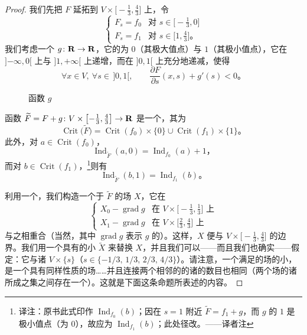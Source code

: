 \begin{proof}
我们先把 $F$ 延拓到 $V\times\bigl[-\tfrac{1}{3},\tfrac{4}{3}\bigr]$ 上，令
\[
\begin{cases}
F_s=f_0 & \text{对 } s\in\bigl[-\tfrac{1}{3},0\bigr]\\
F_s=f_1 & \text{对 } s\in\bigl[1,\tfrac{4}{3}\bigr]\text{。}
\end{cases}
\]
我们考虑一个\trMorseFunction{} $g\colon\mathbf{R}\to\mathbf{R}$，它的\trCriticalPoint{}为 $0$（其极大值点）与 $1$（其极小值点），它在 $]{-\infty},0[$ 上与 $]1,{+\infty}[$ 上递增，而在 $]0,1[$ 上充分地递减，使得
\[
\forall x\in V,\ \forall s\in\,]0,1[,\qquad
\frac{\partial F}{\partial s}(x,s)+g'(s)<0\text{。}
\]

\begin{figure}[htbp]
\centering
{}
\caption{函数 $g$}
\label{fig:function-g}
\end{figure}

函数 $\widetilde{F}=F+g\colon V\times\bigl[-\tfrac{1}{3},\tfrac{4}{3}\bigr]\to\mathbf{R}$ 是一个\trMorseFunction，其\trCriticalPoint{}为
\[
\operatorname{Crit}\bigl(\widetilde{F}\bigr)
  =\operatorname{Crit}(f_0)\times\{0\}\cup\operatorname{Crit}(f_1)\times\{1\}\text{。}
\]
此外，对 $a\in\operatorname{Crit}(f_0)$，
\[
\operatorname{Ind}_{\widetilde{F}}(a,0)=\operatorname{Ind}_{f_0}(a)+1\text{，}
\]
而对 $b\in\operatorname{Crit}(f_1)$，\footnote{译注：原书此式印作 $\operatorname{Ind}_{f_0}(b)$；因在 $s=1$ 附近 $\widetilde{F}=f_1+g$，而 $g$ 的\trCriticalPoint{} $1$ 是极小值点（\trIndex{}为 $0$），故应为 $\operatorname{Ind}_{f_1}(b)$；此处径改。——译者注}则有
\[
\operatorname{Ind}_{\widetilde{F}}(b,1)=\operatorname{Ind}_{f_1}(b)\text{。}
\]

利用一个\trPartitionOfUnity，我们构造一个\trAdapted{}于 $\widetilde{F}$ 的\trPseudogradient{}场 $X$，它在
\[
\begin{cases}
X_0-\operatorname{grad}g & \text{在 } V\times\bigl[-\tfrac{1}{3},\tfrac{1}{3}\bigr]\text{ 上}\\
X_1-\operatorname{grad}g & \text{在 } V\times\bigl[\tfrac{2}{3},\tfrac{4}{3}\bigr]\text{ 上}
\end{cases}
\]
与之相重合（当然，其中 $\operatorname{grad}g$ 表示 $g$ 的\trEuclidean{}\trGradient）。这样，$X$ 便与 $V\times\bigl[-\tfrac{1}{3},\tfrac{4}{3}\bigr]$ 的边界\trTransverse。我们用一个具有\trSmaleCondition{}的小\trPerturbation{} $\widetilde{X}$ 来替换 $X$，并且我们可以——而且我们也确实——假定：它与诸\trSection{} $V\times\{s\}$（$s\in\{-1/3,\,1/3,\,2/3,\,4/3\}$）\trTransverse。请注意，一个满足\trSmaleCondition{}的\trAdapted{}\trPseudogradient{}场的小\trPerturbation{}，是一个具有同样性质的\trAdapted{}\trPseudogradient{}场……并且连接两个\trIndex{}相邻的\trCriticalPoint{}的诸\trTrajectory{}的数目也相同（两个场的诸\trTrajectory{}所成之集之间存在一个\trBijective）。这就是下面这条命题所表述的内容。


\end{proof}
